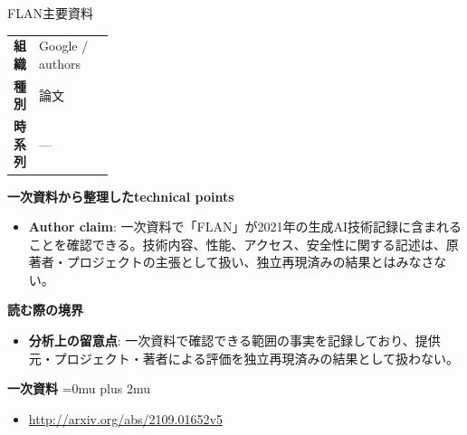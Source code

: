 \begin{technicalnote}{FLAN}{主要資料}
\begingroup
\begin{tabularx}{\linewidth}{@{}>{\bfseries}p{0.22\linewidth}X@{}}
組織 & Google / authors \\
種別 & 論文 \\
時系列 & — \\
\end{tabularx}
\smallskip
{\bfseries 一次資料から整理したtechnical points}
\begin{itemize}[leftmargin=1.5em,itemsep=0.35em]
\item \textbf{Author claim}: 一次資料で「FLAN」が2021年の生成AI技術記録に含まれることを確認できる。技術内容、性能、アクセス、安全性に関する記述は、原著者・プロジェクトの主張として扱い、独立再現済みの結果とはみなさない。
\end{itemize}
\begin{minipage}{\linewidth}
{\bfseries 読む際の境界}
\begin{itemize}[leftmargin=1.5em,itemsep=0.35em]
\item \textbf{分析上の留意点}: 一次資料で確認できる範囲の事実を記録しており、提供元・プロジェクト・著者による評価を独立再現済みの結果として扱わない。
\end{itemize}
\begin{samepage}
{\bfseries 一次資料}
\begingroup\sloppy
\Urlmuskip=0mu plus 2mu\relax
\begin{itemize}[leftmargin=1.5em,itemsep=0.25em]
\item {\scriptsize\url{http://arxiv.org/abs/2109.01652v5}}
\end{itemize}
\endgroup
\end{samepage}
\end{minipage}
\endgroup
\end{technicalnote}
\medskip

